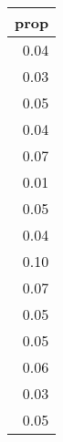 \begin{tabular}{r}
  \toprule
 prop \\ 
  \midrule
  0.04 \\ 
  0.03 \\ 
  0.05 \\ 
  0.04 \\ 
  0.07 \\ 
  0.01 \\ 
  0.05 \\ 
  0.04 \\ 
  0.10 \\ 
  0.07 \\ 
  0.05 \\ 
  0.05 \\ 
  0.06 \\ 
  0.03 \\ 
  0.05 \\ 
   \bottomrule
\end{tabular}
